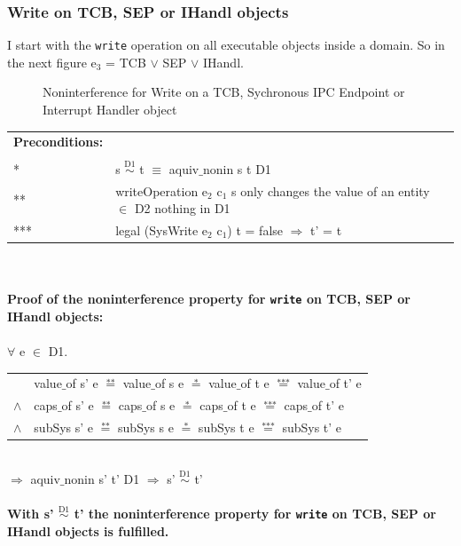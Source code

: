 \documentclass[11pt,a4paper,twoside]{article}
\begin{document}
{\subsubsection{Write on TCB, SEP or IHandl objects}
I start with the \texttt{write} operation on all executable objects inside a domain. So in the next figure e$_3$ = TCB $\vee$ SEP $\vee$ IHandl.
\begin{flushleft}
\begin{figure}[H]
\caption{Noninterference for Write on a TCB, Sychronous IPC Endpoint or Interrupt Handler object}
\end{figure}
\end{flushleft}
\begin{tabular}{ll}
\textbf{Preconditions:} \\ \\
* & s $\overset{\text{D1}}{\sim}$ t $\equiv$ aquiv$\_$nonin s t D1	\\ 
** & writeOperation e$_2$ c$_1$ s only changes the value of an entity $\in$ D2 nothing in D1 \\ 
*** & legal (SysWrite e$_2$ c$_1$) t = false $\Rightarrow$ t' = t
\end{tabular} \\ \\ 
\textbf{Proof of the noninterference property for \texttt{write} on TCB, SEP or IHandl objects:}\\ \\
$\forall$ e $\in$ D1. \\ 
\begin{tabular}{ll}
& value$\_$of s' e $\overset{\text{**}}{=}$ value$\_$of s e $\overset{\text{*}}{=}$ value$\_$of t e $\overset{\text{***}}{=}$ value$\_$of t' e \\
$\wedge$ & caps$\_$of s' e $\overset{\text{**}}{=}$ caps$\_$of s e $\overset{\text{*}}{=}$ caps$\_$of t e $\overset{\text{***}}{=}$ caps$\_$of t' e \\
$\wedge$ & subSys s' e $\overset{\text{**}}{=}$ subSys s e $\overset{\text{*}}{=}$ subSys t e $\overset{\text{***}}{=}$ subSys t' e
\end{tabular} \\
$\Rightarrow$ aquiv$\_$nonin s' t' D1 $\Rightarrow$ s' $\overset{\text{D1}}{\sim}$ t' \\ \\
\textbf{With s' $\overset{\text{D1}}{\sim}$ t' the noninterference property for \texttt{write} on TCB, SEP or IHandl objects is fulfilled.} 
\clearpage
}
\end{document}
